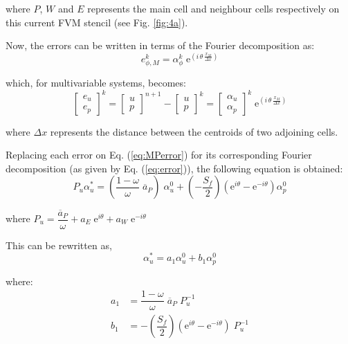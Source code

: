 \documentclass[final,3p,times,11pt,onecolumn]{myElsarticle}
\numberwithin{equation}{section}
\begin{document}
\noindent where $P$, $W$ and $E$ represents the main cell and neighbour cells respectively on this current FVM stencil (see Fig. \ref{fig:4a}).

Now, the errors can be written in terms of the Fourier decomposition as:
\begin{equation}
    e^k_{\phi,M} = \alpha^k_{\phi} \; \text{e}^{\left( i \, \theta \, \frac{x_M}{\Delta x}\right)}
    \label{eq:error}
\end{equation}

\noindent which, for multivariable systems, becomes:
\begin{equation}
\begin{bmatrix}
e_u \\
e_p 
\end{bmatrix}^{k}
=
\begin{bmatrix}
u \\
p 
\end{bmatrix}^{n+1}
-\begin{bmatrix}
u \\
p 
\end{bmatrix}^{k}
=
\begin{bmatrix}
\alpha_u \\
\alpha_p 
\end{bmatrix}^{k}
\; \text{e}^{\left( i \, \theta \, \frac{x_M}{\Delta x}\right)}
\label{eq:fou1}
\end{equation}

\noindent where $\Delta x$ represents the distance between the centroids of two adjoining cells. 

Replacing each error on Eq. (\ref{eq:MPerror}) for its corresponding Fourier decomposition (as given by Eq. (\ref{eq:error})), the following equation is obtained:
\begin{equation}
    P_u \alpha_u^* = \left( \dfrac{1-\omega}{\omega} \; \overline{a}_P \right) \; \alpha_u^0 + \left(- \dfrac{S_f}{2} \right) \left(\text{e}^{i \theta} -  \text{e}^{-i \theta} \right) \alpha_p^0
    \label{eq:MPfou}
\end{equation}

\noindent where $P_u = \dfrac{\overline{a}_P}{\omega}  + a_E \; \text{e}^{i \theta} + a_W \; \text{e}^{-i \theta}$

This can be rewritten as,
\begin{equation}
     \alpha_u^* = a_1 \alpha_u^0 + b_1 \alpha_p^0
    \label{eq:MPfou2}
\end{equation}

\noindent where:
\begin{equation}
\begin{split}
     a_1 &= \dfrac{1-\omega}{\omega} \; \overline{a}_P \; P_u^{-1} \\
     b_1 &= - \left( \dfrac{S_f}{2} \right) \left( \text{e}^{i \theta} -  \text{e}^{-i \theta} \right) \; P_u^{-1}
\end{split}
\end{equation}
\end{document}

